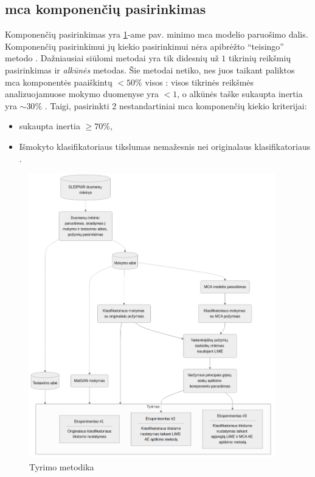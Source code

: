 \subsection{\gls{mca} komponenčių pasirinkimas}
Komponenčių pasirinkimas yra \ref{fig:methodology}-ame pav. minimo \gls{mca} modelio paruošimo dalis. Komponenčių pasirinkimui \ty jų kiekio pasirinkimui nėra apibrėžto \enquote{teisingo} metodo \cite{abdiPrincipalComponentAnalysis2010}. Dažniausiai siūlomi metodai yra tik didesnių už $1$ tikrinių reikšmių pasirinkimas ir \textit{alkūnės}  metodas. Šie metodai netiko, nes juos taikant paliktos \gls{mca} komponentės paaiškintų $<50\%$ visos : visos tikrinės reikšmės analizuojamuose mokymo duomenyse yra $<1$, o alkūnės taške sukaupta \gls{inertia} yra $\sim 30\%$ . Taigi, pasirinkti 2 nestandartiniai \gls{mca} komponenčių kiekio kriterijai: 
\begin{itemize}
    \item sukaupta \gls{inertia} $\ge 70\%$,
    \item Išmokyto klasifikatoriaus tikslumas nemažesnis nei originalaus klasifikatoriaus \TODO.
\end{itemize}

\begin{figure}[h]
    \centering
    \includegraphics[width=0.95\textwidth]{images/methodology.png}
    \caption{Tyrimo metodika}
    \label{fig:methodology}
\end{figure}

